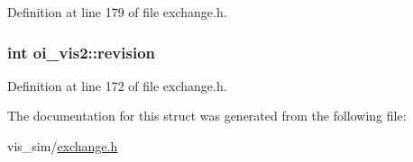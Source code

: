 Definition at line 179 of file exchange.h.

\hypertarget{structoi__vis2_a6086c7ebeff02b008f21f4354f98962b}{
\subsubsection[{revision}]{\setlength{\rightskip}{0pt plus 5cm}int {\bf oi\_\-vis2::revision}}}
\label{structoi__vis2_a6086c7ebeff02b008f21f4354f98962b}


Definition at line 172 of file exchange.h.



The documentation for this struct was generated from the following file:\begin{DoxyCompactItemize}
\item 
vis\_\-sim/\hyperlink{exchange_8h}{exchange.h}\end{DoxyCompactItemize}
